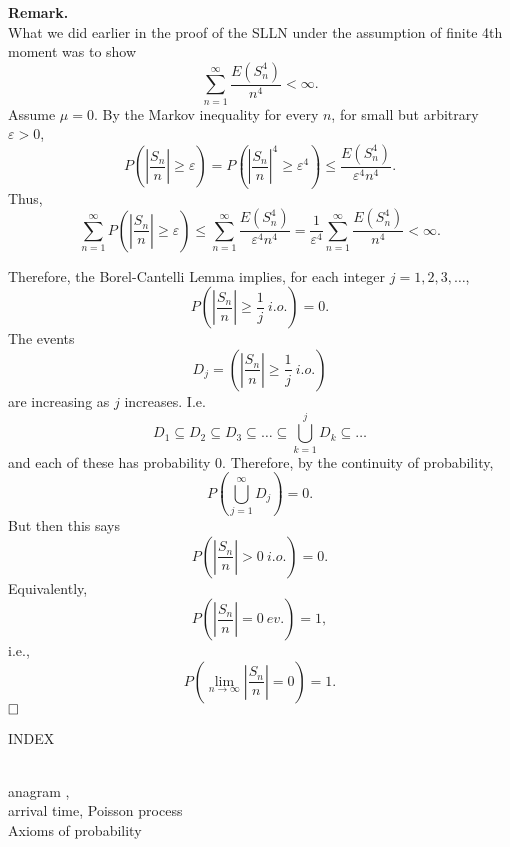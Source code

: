 \documentclass[12pt]{article}
\begin{document}
\newpage



\noindent\textbf{Remark.}\\
What we did earlier in the proof of the SLLN under the assumption of finite 4th moment was to show
$$ \sum_{n=1}^{\infty} \frac{E(S_n^4)}{n^4} < \infty.$$
Assume $\mu = 0$.  By the Markov inequality for every $n$, for small but arbitrary $\varepsilon > 0$,
$$ P\left( \left|\frac{S_n}{n}\right| \geq \varepsilon \right) = P\left( \left|\frac{S_n}{n}\right|^4  \geq \varepsilon^4 \right) \leq \frac{E(S_n^4)}{\varepsilon^4 n^4}. $$
Thus,
$$ \sum_{n=1}^{\infty} P\left( \left|\frac{S_n}{n}\right|  \geq \varepsilon \right) \leq \sum_{n=1}^{\infty} \frac{E(S_n^4)}{\varepsilon^4 n^4} = \frac{1}{\varepsilon^4}\sum_{n=1}^{\infty}\frac{E(S_n^4)}{n^4} < \infty.$$

\bigskip
\noindent Therefore, the Borel-Cantelli Lemma implies, for each integer $j=1,2,3,\dots$,
$$ P\left( \left| \frac{S_n}{n} \right| \geq \frac{1}{j} ~i.o. \right) = 0. $$
The events
$$ D_{j} = \left( \left| \frac{S_n}{n} \right| \geq \frac{1}{j} ~i.o. \right) $$
are increasing as $j$ increases. I.e.
$$ D_1 \subseteq D_2 \subseteq D_3 \subseteq \dots \subseteq \bigcup_{k=1}^{j} D_k \subseteq \dots$$
and each of these has probability $0$. Therefore, by the continuity of probability,
$$ P\left( \bigcup_{j=1}^{\infty} D_{j} \right) = 0. $$
But then this says
$$ P\left( \left|\frac{S_n}{n}\right| > 0 ~i.o.\right) = 0. $$
Equivalently,
$$ P\left( \left|\frac{S_n}{n}\right| = 0 ~ev.\right) = 1, $$
i.e.,
$$ P\left( \lim_{n\to\infty} \left|\frac{S_n}{n}\right| = 0 \right) = 1. $$$\hfill\Box$



























\newpage







\begin{center}{\Large INDEX}\end{center}

\\
\noindent anagram \pageref{d:anagram}, \pageref{countinganagrams}\\
\noindent arrival time, Poisson process \pageref{arrivaltime}\\
\noindent Axioms of probability \pageref{axioms1}\\
\end{document}

